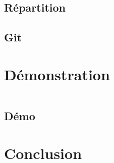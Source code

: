 \documentclass{beamer}
\begin{document}
        \subsection{Répartition}
	        
	    \subsection{Git}
	            
	
	  \section{Démonstration}
        \begin{frame}
            \begin{columns}[t]
  				\begin{column}{5cm}
  					\tableofcontents[sections={1-4}, currentsection, hideothersubsections]
  				\end{column}
  				\begin{column}{5cm}
  				\tableofcontents[sections={5-9}, currentsection, hideothersubsections]
  				\end{column}
  			\end{columns}
        \end{frame}
        \subsection{Démo}
	        
        	
    \section{Conclusion}
        \subsection{}
            
\end{document}
